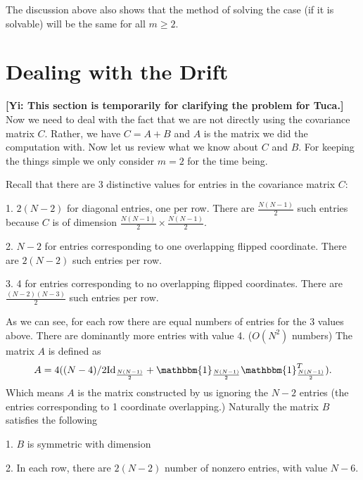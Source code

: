 \documentclass[10pt]{article}
\newcommand{\gy}[1]{\textbf{\color{red}[Yi: #1]}}
\newenvironment{Proof of lemma}{\noindent{\bf Proof of Lemma}}{\hfill$\Box$\newline}
\newenvironment{Proof of claim}{\noindent{\bf Proof of claim}}{\hfill$\Box$\newline}
\newenvironment{Proof of theorem}{\noindent{\bf Proof of Theorem}}{\hfill\scriptsize{$\Box$}\newline}
\newenvironment{Proof of theorems}{\noindent{\bf Proof of Theorems}}{\hfill$\Box$\newline}
\newenvironment{Proof of proposition}{\noindent{\bf Proof of Proposition}}{\hfill$\Box$\newline}
\newenvironment{Proof of propositions}{\noindent{\bf Proof of Propositions}}{\hfill$\Box$\newline}
\newenvironment{Proof of exercise}{\noindent{\it Proof of Exercise:}}{\hfill$\Box$}
\numberwithin{equation}{section}
\begin{document}
The discussion above also shows that the method of solving the case (if it is solvable) will be the same for all $m \geq 2$.
\section{Dealing with the Drift}
\gy{This section is temporarily for clarifying the problem for Tuca.} Now we need to deal with the fact that we are not directly using the covariance matrix $C$. Rather, we have $C=A+B$ and $A$ is the matrix we did the computation with. Now let us review what we know about $C$ and $B$. For keeping the things simple we only consider $m=2$ for the time being.

Recall that there are 3 distinctive values for entries in the covariance matrix $C$:

1. $2(N-2)$ for diagonal entries, one per row. There are $\frac{N(N-1)}{2}$ such entries because $C$ is of dimension $\frac{N(N-1)}{2} \times \frac{N(N-1)}{2}$.

2. $N-2$ for entries corresponding to one overlapping flipped coordinate. There are $2(N-2)$ such entries per row.

3. 4 for entries corresponding to no overlapping flipped coordinates. There are $\frac{(N-2)(N-3)}{2}$ such entries per row.

As we can see, for each row there are equal numbers of entries for the 3 values above. There are dominantly more entries with value 4. ($O(N^2)$ numbers) The matrix $A$ is defined as 
\begin{align}
   A = 4((N-4)/2\text{Id}_{\frac{N(N-1)}{2}} + \mathbbm{1}_{\frac{N(N-1)}{2}}\mathbbm{1}^T_{\frac{N(N-1)}{2}}).
\end{align}
Which means $A$ is the matrix constructed by us ignoring the $N-2$ entries (the entries corresponding to 1 coordinate overlapping.) Naturally the matrix $B$ satisfies the following

1. $B$ is symmetric with dimension 

2. In each row, there are $2(N-2)$ number of nonzero entries, with value $N-6$.
\end{document}
